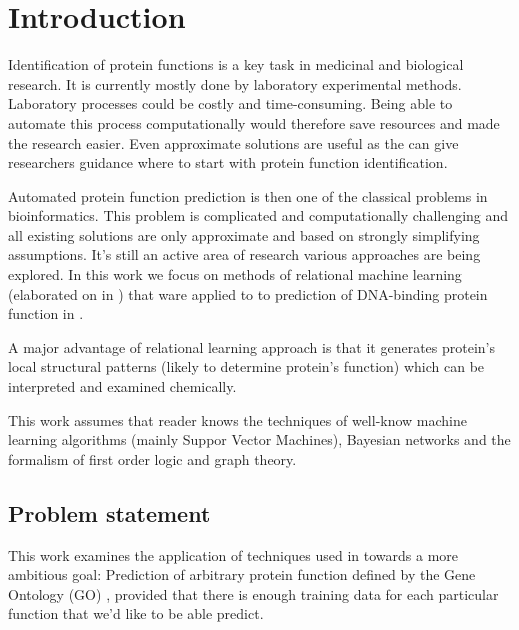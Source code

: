 \documentclass[11pt,twoside,a4paper]{book}
\begin{document}
\chapter{Introduction}
Identification of protein functions is a key task in medicinal and biological research.
It is currently mostly done by laboratory experimental methods.
Laboratory processes could be costly and time-consuming. 
Being able to automate this process computationally would therefore save resources
and made the research easier.
Even approximate solutions are useful as the can give researchers guidance where
to start with protein function identification.

Automated protein function prediction is then one of the classical problems in bioinformatics. 
This problem is complicated and computationally challenging and all existing solutions
are only approximate and based on strongly simplifying assumptions.
It's still an active area of research various approaches are being explored. 
In this work we focus on methods of relational machine learning (elaborated on in \cite{kuzelka}\cite{relf})
that ware applied to to prediction of DNA-binding protein function in \cite{szabova}.

A major advantage of relational learning approach is that it generates protein's local structural patterns
(likely to determine protein's function) which can be interpreted and examined chemically.

This work assumes that reader knows
the techniques of well-know machine learning algorithms (mainly Suppor Vector Machines),
Bayesian networks
and the formalism of first order logic and graph theory.

\section{Problem statement}

This work examines the application of techniques used in \cite{szabova} towards a more ambitious goal:
Prediction of arbitrary protein function
defined by the Gene Ontology (GO) \cite{go}\cite{gores},
provided that there is enough training data for each particular function that we'd like to be able predict.
\end{document}
